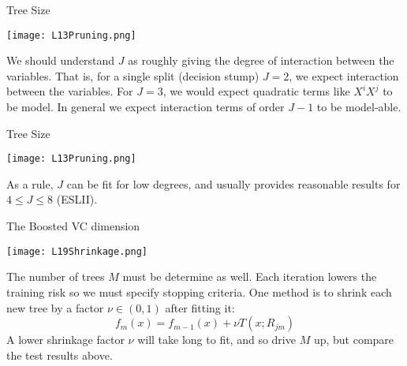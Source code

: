 \documentclass[10pt, table, dvipsnames,xcdraw, handout]{beamer}
\begin{document}
 \begin{frame}[fragile]{Tree Size}
   \begin{minipage}[t][0.5\textheight][t]{\textwidth}
	\centering \texttt{[image: L13Pruning.png]} 
  \end{minipage}
  \vfill
\begin{minipage}[t][0.5\textheight][t]{\textwidth}
We should understand $J$ as roughly giving the degree of interaction between the variables. That is, for a single split (decision stump) $J=2$, we expect interaction between the variables. \pause For $J=3$, we would expect quadratic terms like $X^iX^j$ to be model. In general we expect interaction terms of order $J-1$ to be model-able. 
\end{minipage}

\end{frame}


 \begin{frame}[fragile]{Tree Size}
   \begin{minipage}[t][0.5\textheight][t]{\textwidth}
	\centering \texttt{[image: L13Pruning.png]} 
  \end{minipage}
  \vfill
\begin{minipage}[t][0.5\textheight][t]{\textwidth}
As a rule, $J$ can be fit for low degrees, and usually provides reasonable results for $4\leq J\leq 8$ (ESLII). 
\end{minipage}
\end{frame}



 \begin{frame}[fragile]{The Boosted VC dimension}
   \begin{minipage}[t][0.5\textheight][t]{\textwidth}
	\centering \texttt{[image: L19Shrinkage.png]} 
  \end{minipage}
  \vfill
\begin{minipage}[t][0.5\textheight][t]{\textwidth}
The number of trees $M$ must be determine as well. Each iteration lowers the training risk so we must specify stopping criteria. One method is to shrink each new tree by a factor $\nu\in (0,1)$ after fitting it:
$$
f_m(x) = f_{m-1}(x) + \nu T(x;R_{jm})
$$\pause
A lower shrinkage factor $\nu$ will take long to fit, and so drive $M$ up, but compare the test results above. 
\end{minipage}
\end{frame}
\end{document}
